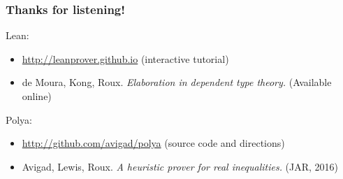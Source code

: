 \documentclass{beamer}
\begin{document}
\begin{frame}
\frametitle{Thanks for listening!}
Lean:
\begin{itemize}
\item \url{http://leanprover.github.io} (interactive tutorial)
\item de Moura, Kong, Roux. \emph{Elaboration in dependent type theory.} (Available online)
\end{itemize}

Polya:
\begin{itemize}
\item \url{http://github.com/avigad/polya} (source code and directions)
\item Avigad, Lewis, Roux. \emph{A heuristic prover for real inequalities.} (JAR, 2016)
\end{itemize}
\end{frame}
\end{document}
